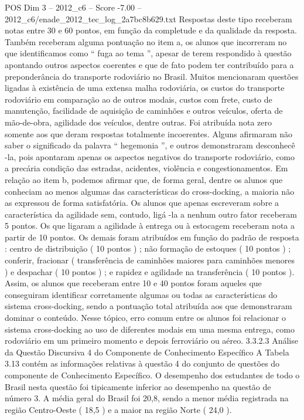 \begin{textsample}{POS Dim 3 – 2012\_c6 – Score -7.00 – 2012\_c6/enade\_2012\_tec\_log\_2a7bc8b629.txt}
Respostas deste tipo receberam notas entre 30 e 60 pontos, em função da completude e da qualidade da resposta.
Também receberam alguma pontuação no item a, os alunos que incorreram no que identificamos como “ fuga ao tema ”, apesar de terem respondido à questão apontando outros aspectos coerentes e que de fato podem ter contribuído para a preponderância do transporte rodoviário no Brasil.
Muitos mencionaram questões ligadas à existência de uma extensa malha rodoviária, os custos do transporte rodoviário em comparação ao de outros modais, custos com frete, custo de manutenção, facilidade de aquisição de caminhões e outros veículos, oferta de mão-de-obra, agilidade dos veículos, dentre outras.
Foi atribuída nota zero somente aos que deram respostas totalmente incoerentes.
Alguns afirmaram não saber o significado da palavra “ hegemonia ”, e outros demonstraram desconhecê -la, pois apontaram apenas os aspectos negativos do transporte rodoviário, como a precária condição das estradas, acidentes, violência e congestionamentos.
Em relação ao item b, podemos afirmar que, de forma geral, dentre os alunos que conheciam ao menos algumas das características do cross-docking, a maioria não as expressou de forma satisfatória.
Os alunos que apenas escreveram sobre a característica da agilidade sem, contudo, ligá -la a nenhum outro fator receberam 5 pontos.
Os que ligaram a agilidade à entrega ou à estocagem receberam nota a partir de 10 pontos.
Os demais foram atribuídos em função do padrão de resposta : centro de distribuição ( 10 pontos ) ; não formação de estoques ( 10 pontos ) ; conferir, fracionar ( transferência de caminhões maiores para caminhões menores ) e despachar ( 10 pontos ) ; e rapidez e agilidade na transferência ( 10 pontos ).
Assim, os alunos que receberam entre 10 e 40 pontos foram aqueles que conseguiram identificar corretamente algumas ou todas as características do sistema cross-docking, sendo a pontuação total atribuída aos que demonstraram dominar o conteúdo.
Nesse tópico, erro comum entre os alunos foi relacionar o sistema cross-docking ao uso de diferentes modais em uma mesma entrega, como rodoviário em um primeiro momento e depois ferroviário ou aéreo. 3.3.2.3 Análise da Questão Discursiva 4 do Componente de Conhecimento Específico A Tabela 3.13 contém as informações relativas à questão 4 do conjunto de questões do componente de Conhecimento Específico.
O desempenho dos estudantes de todo o Brasil nesta questão foi tipicamente inferior ao desempenho na questão de número 3.
A média geral do Brasil foi 20,8, sendo a menor média registrada na região Centro-Oeste ( 18,5 ) e a maior na região Norte ( 24,0 ).

\end{textsample}
